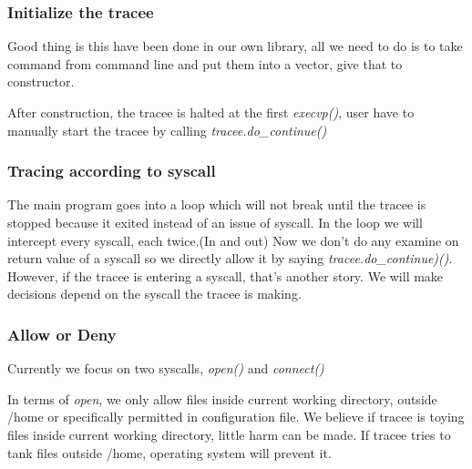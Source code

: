 \documentclass[conference,compsoc]{IEEEtran}
\begin{document}
		\subsubsection{Initialize the tracee}
			\par
				Good thing is this have been done in our own library, all we need to do is to take command from command line and put them into a vector, give that to constructor. 
			\par
				After construction, the tracee is halted at the first \emph{execvp()}, user have to manually start the tracee by calling \emph{tracee.do\_continue()}

		\subsubsection{Tracing according to syscall}
			\par
				The main program goes into a loop which will not break until the tracee is stopped because it exited instead of an issue of syscall.
				In the loop we will intercept every syscall, each twice.(In and out)
				Now we don't do any examine on return value of a syscall so we directly allow it by saying \emph{tracee.do\_continue)()}.
				However, if the tracee is entering a syscall, that's another story.
				We will make decisions depend on the syscall the tracee is making.
		\subsubsection{Allow or Deny}
			\par
				Currently we focus on two syscalls, \emph{open()} and \emph{connect()}
			\par
				In terms of \emph{open}, we only allow files inside current working directory, outside /home or specifically permitted in configuration file.
				We believe if tracee is toying files inside current working directory, little harm can be made.
				If tracee tries to tank files outside /home, operating system will prevent it.
				
\end{document}
